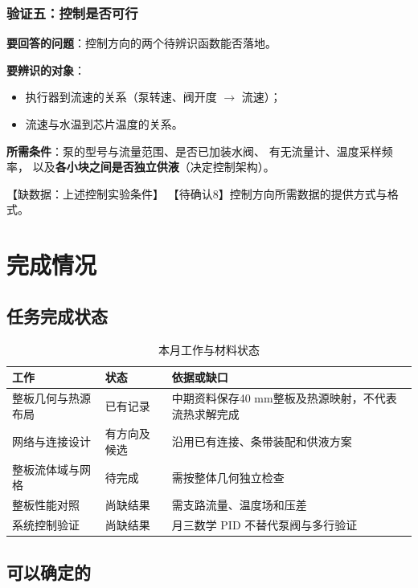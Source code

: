 \documentclass[stage2,fontset=fandol]{ydzjreport}
\begin{document}
\subsubsection{验证五：控制是否可行}

\textbf{要回答的问题}：控制方向的两个待辨识函数能否落地。

\textbf{要辨识的对象}：
\begin{itemize}
  \item 执行器到流速的关系（泵转速、阀开度 $\rightarrow$ 流速）；
  \item 流速与水温到芯片温度的关系。
\end{itemize}

\textbf{所需条件}：泵的型号与流量范围、是否已加装水阀、
有无流量计、温度采样频率，
以及\textbf{各小块之间是否独立供液}（决定控制架构）。

【缺数据：上述控制实验条件】
【待确认8】控制方向所需数据的提供方式与格式。


\section{完成情况}

\subsection{任务完成状态}

\begin{table}[H]\centering
\caption{本月工作与材料状态}\label{tab:tasks}
\begin{tabularx}{\textwidth}{@{}Y Y Y@{}}
\toprule
{} 工作 & 状态 & 依据或缺口 \\
\midrule
整板几何与热源布局 & 已有记录 & 中期资料保存40 mm整板及热源映射，不代表流热求解完成 \\
网络与连接设计 & 有方向及候选 & 沿用已有连接、条带装配和供液方案 \\
整板流体域与网格 & 待完成 & 需按整体几何独立检查 \\
整板性能对照 & 尚缺结果 & 需支路流量、温度场和压差 \\
系统控制验证 & 尚缺结果 & 月三数学 PID 不替代泵阀与多行验证 \\
\bottomrule\end{tabularx}\end{table}



\subsection{可以确定的}
\end{document}
